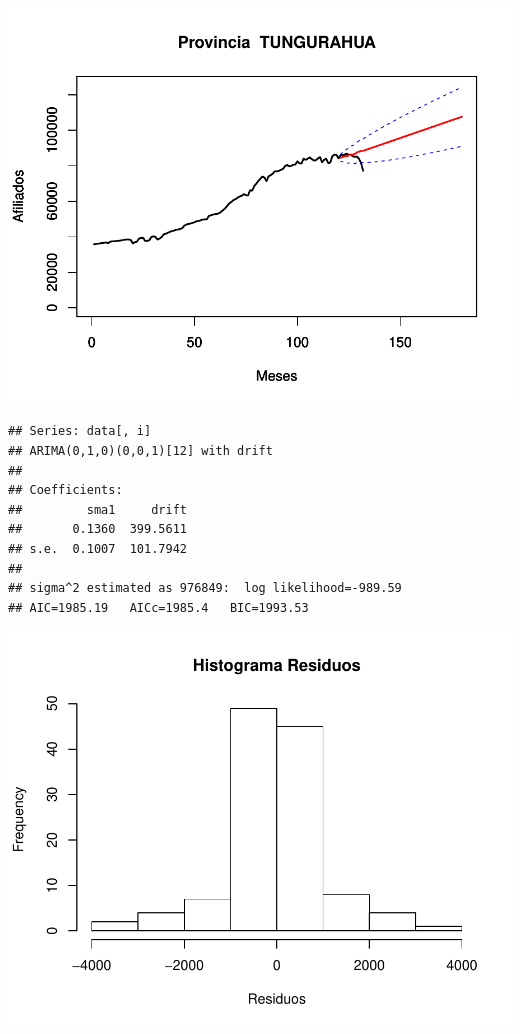 \documentclass[11pt,a4paper,oneside]{article}\usepackage[]{graphicx}\usepackage[]{color}
\makeatletter
\def\maxwidth{ %
  \ifdim\Gin@nat@width>\linewidth
    \linewidth
  \else
    \Gin@nat@width
  \fi
}
\newenvironment{kframe}{%
 \def\at@end@of@kframe{}%
 \ifinner\ifhmode%
  \def\at@end@of@kframe{\end{minipage}}%
  \begin{minipage}{\columnwidth}%
 \fi\fi%
 \def\FrameCommand##1{\hskip\@totalleftmargin \hskip-\fboxsep
 \colorbox{shadecolor}{##1}\hskip-\fboxsep
     \hskip-\linewidth \hskip-\@totalleftmargin \hskip\columnwidth}%
 \MakeFramed {\advance\hsize-\width
   \@totalleftmargin\z@ \linewidth\hsize
   \@setminipage}}%
 {\par\unskip\endMakeFramed%
 \at@end@of@kframe}
\newenvironment{knitrout}{}{} %
\makeatother
\begin{document}
\begin{knitrout}
{\centering \includegraphics[width=\maxwidth]{figure/unnamed-chunk-16-67} 

}


\begin{kframe}\begin{verbatim}
## Series: data[, i] 
## ARIMA(0,1,0)(0,0,1)[12] with drift         
## 
## Coefficients:
##         sma1     drift
##       0.1360  399.5611
## s.e.  0.1007  101.7942
## 
## sigma^2 estimated as 976849:  log likelihood=-989.59
## AIC=1985.19   AICc=1985.4   BIC=1993.53
\end{verbatim}
\end{kframe}

{\centering \includegraphics[width=\maxwidth]{figure/unnamed-chunk-16-68} 

}
\end{knitrout}
\end{document}
